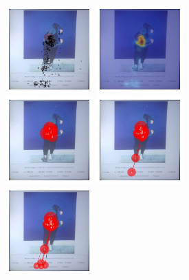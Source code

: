 \documentclass[11pt]{asaproc}
\begin{document}
\begin{figure}[t]
\begin{center} 
\includegraphics[width=0.30\textwidth]{figures/Subject13_scatterplot_posture14.jpg} \hspace{1pt}
\includegraphics[width=0.30\textwidth]{figures/Subject13_heatmap_posture14_new.jpg} \\
\includegraphics[width=0.30\textwidth]{figures/Subject13_scanpath_posture14_lambda_1.jpg} \hspace{1pt}
\includegraphics[width=0.30\textwidth]{figures/Subject13_scanpath_posture14_lambda_2.jpg} \\
\includegraphics[width=0.30\textwidth]{figures/Subject13_scanpath_posture14_lambda_3.jpg} \hspace{1pt}

\end{center}
\end{figure}
\end{document}
